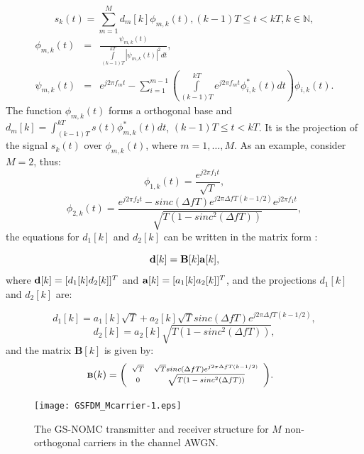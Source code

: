 \documentclass[twocolumn]{el-author}
\begin{document}
\begin{equation}\label{s(t)}
s_k(t)  =  \sum_{m=1}^{M}d_m[k]\phi_{m,k}(t), (k-1)T \leq t<kT, k \in \mathbb{N},
\end{equation}
\begin{eqnarray}
\phi_{m,k}(t)&=&\frac{\psi_{m,k}(t)}{\int\limits_{(k-1)T}^{kT}|\psi_{m,k}(t)|^2dt}, \nonumber \\
\psi_{m,k}(t) &=& e^{j2\pi f_mt} -\sum_{i=1}^{m-1}\left(\int\limits_{(k-1)T}^{kT}e^{j2\pi f_mt}\phi^*_{i,k}(t)dt\right)\phi_{i,k}(t). \nonumber
\end{eqnarray}
The function $\phi_{m,k}(t)$ forms a orthogonal base and $d_m[k]=\int_{(k-1)T}^{kT}s(t)\phi ^*_{m,k}(t)dt$, $(k-1)T \leq t<kT$. It is the projection of the signal $s_k(t)$ over $\phi_{m,k}(t)$, where $m=1, \ldots, M$. As an example, consider $M=2$, thus:
\begin{equation} \label{fi1}
\phi_{1,k}(t) = \frac{e^{j2\pi f_1t}}{\sqrt{T}},  
\end{equation}
\begin{equation}\label{fi2}
\phi_{2,k}(t) = \frac{e^{j2\pi f_2t}-sinc(\Delta fT)e^{j2\pi \Delta fT(k-1/2)}e^{j2\pi f_1t}}{\sqrt{T(1-sinc^2(\Delta fT))}},  
\end{equation}
the equations for $d_1[k]$ and $d_2[k]$ can be written in the matrix form :

\begin{equation}\label{MatrixB}
\bold{d}[k]=\bold{B}[k]\bold{a}[k],
\end{equation}
where $\bold{d}[k]=[d_1[k] d_2[k]]^T$ and $\bold{a}[k]=[a_1[k] a_2[k]]^T$, and the projections $d_1[k]$ and $d_2[k]$ are:

\begin{equation} \label{d1}
d_1[k] =  a_1[k]\sqrt{T}+a_2[k]\sqrt{T}sinc(\Delta fT)e^{j2\pi \Delta fT(k-1/2) },
\end{equation}
\begin{equation}\label{d2}
d_2[k] =  a_2[k]\sqrt{T(1-sinc^2(\Delta fT))}, 
\end{equation}
and the matrix $\textbf{B}[k]$ is given by:
$$\scriptsize {
\textbf{B}(k)=\left(\begin{array}{cc} \sqrt{T}&\sqrt{T}sinc(\Delta fT)e^{j2\pi \Delta fT(k-1/2)}\\
0 & \sqrt{T(1-sinc^2(\Delta fT))}
\end{array}\right)}.\quad$$


\begin{figure}[!]
\begin{center}
\texttt{[image: GSFDM\_Mcarrier-1.eps]}%
\caption{The GS-NOMC transmitter and receiver structure for $M$ non-orthogonal carriers in the channel AWGN.}
\label{GS-NOMC}
\end{center}
\end{figure}
\end{document}
